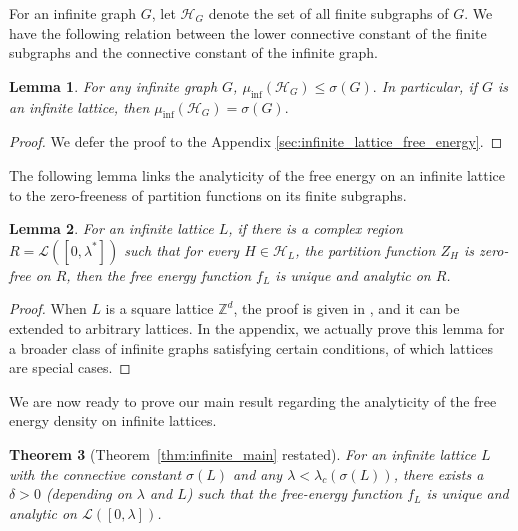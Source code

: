 \documentclass[a4paper,11pt]{article}
\theoremstyle{plain}
\newtheorem{theorem}{Theorem}[section]
\newtheorem{lemma}[theorem]{Lemma}
\theoremstyle{definition}
\theoremstyle{remark}
\newcommand{\1}{\mathbf{1}}
\begin{document}
For an infinite graph $G$, let $\mathcal{H}_G$ denote the set of all finite subgraphs of $G$. We have the following relation between the lower connective constant of the finite subgraphs and the connective constant of the infinite graph.



\begin{lemma}
    \label{lem:muinf_le_sigma}
    For any infinite graph $G$, $\mu_{\inf}(\mathcal{H}_G)\leq \sigma(G).$
    In particular, if $G$ is an infinite lattice, then $\mu_{\inf}(\mathcal{H}_G)= \sigma(G).$
\end{lemma}

\begin{proof}
    We defer the proof to the Appendix \ref{sec:infinite_lattice_free_energy}.
\end{proof}

The following lemma links the analyticity of the free energy on an infinite lattice to the zero-freeness of partition functions on its finite subgraphs.

\begin{lemma}
    \label{lem:infinite_main}
    For an infinite lattice $L$, if there is a complex region $R=\mathcal L ([0, \lambda^\ast])$ such that for every $H\in \mathcal{H}_L$, the partition function $Z_H$ is zero-free on $R$, then the free energy function $f_L$ is unique and analytic on $R$. 
\end{lemma}

\begin{proof}
    When $L$ is a square lattice $\mathbb{Z}^d$, the proof is given in \cite{scott2005repulsive}, and it can be extended to arbitrary lattices.
    In the appendix, we actually prove this lemma for a broader class of infinite graphs satisfying certain conditions, of which lattices are special cases.  
\end{proof}

We are now ready to prove our main result  regarding the analyticity of the free energy density on infinite lattices.

\begin{theorem}[Theorem~\ref{thm:infinite_main} restated]
    For an infinite lattice $L$ with the connective constant $\sigma(L)$ and any $\lambda < \lambda_c(\sigma(L))$, there exists a $\delta>0$ (depending on $\lambda$ and $L$) such that the free-energy function $f_L$ is unique and analytic on $\mathcal{L}([0, \lambda])$.
\end{theorem}
\end{document}
